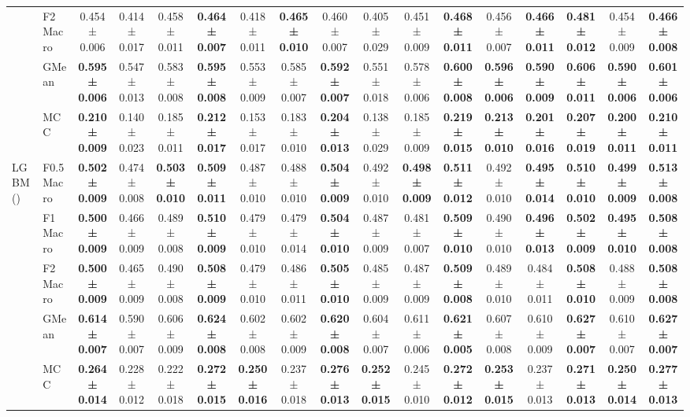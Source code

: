 \begin{table}[H]
{\begin{tabular}{llccccccccccccccc}
 & F2 Macro & 0.454 ± 0.006 & 0.414 ± 0.017 & 0.458 ± 0.011 & \textbf{0.464 ± 0.007} & 0.418 ± 0.011 & \textbf{0.465 ± 0.010} & 0.460 ± 0.007 & 0.405 ± 0.029 & 0.451 ± 0.009 & \textbf{0.468 ± 0.011} & 0.456 ± 0.007 & \textbf{0.466 ± 0.011} & \textbf{0.481 ± 0.012} & 0.454 ± 0.009 & \textbf{0.466 ± 0.008} \\
 & GMean & \textbf{0.595 ± 0.006} & 0.547 ± 0.013 & 0.583 ± 0.008 & \textbf{0.595 ± 0.008} & 0.553 ± 0.009 & 0.585 ± 0.007 & \textbf{0.592 ± 0.007} & 0.551 ± 0.018 & 0.578 ± 0.006 & \textbf{0.600 ± 0.008} & \textbf{0.596 ± 0.006} & \textbf{0.590 ± 0.009} & \textbf{0.606 ± 0.011} & \textbf{0.590 ± 0.006} & \textbf{0.601 ± 0.006} \\
 & MCC & \textbf{0.210 ± 0.009} & 0.140 ± 0.023 & 0.185 ± 0.011 & \textbf{0.212 ± 0.017} & 0.153 ± 0.017 & 0.183 ± 0.010 & \textbf{0.204 ± 0.013} & 0.138 ± 0.029 & 0.185 ± 0.009 & \textbf{0.219 ± 0.015} & \textbf{0.213 ± 0.010} & \textbf{0.201 ± 0.016} & \textbf{0.207 ± 0.019} & \textbf{0.200 ± 0.011} & \textbf{0.210 ± 0.011} \\
\cline{1-17}
\multirow[t]{5}{*}{LGBM()} & F0.5 Macro & \textbf{0.502 ± 0.009} & 0.474 ± 0.008 & \textbf{0.503 ± 0.010} & \textbf{0.509 ± 0.011} & 0.487 ± 0.010 & 0.488 ± 0.010 & \textbf{0.504 ± 0.009} & 0.492 ± 0.010 & \textbf{0.498 ± 0.009} & \textbf{0.511 ± 0.012} & 0.492 ± 0.010 & \textbf{0.495 ± 0.014} & \textbf{0.510 ± 0.010} & \textbf{0.499 ± 0.009} & \textbf{0.513 ± 0.008} \\
 & F1 Macro & \textbf{0.500 ± 0.009} & 0.466 ± 0.009 & 0.489 ± 0.008 & \textbf{0.510 ± 0.009} & 0.479 ± 0.010 & 0.479 ± 0.014 & \textbf{0.504 ± 0.010} & 0.487 ± 0.009 & 0.481 ± 0.007 & \textbf{0.509 ± 0.010} & 0.490 ± 0.010 & \textbf{0.496 ± 0.013} & \textbf{0.502 ± 0.009} & \textbf{0.495 ± 0.010} & \textbf{0.508 ± 0.008} \\
 & F2 Macro & \textbf{0.500 ± 0.009} & 0.465 ± 0.009 & 0.490 ± 0.008 & \textbf{0.508 ± 0.009} & 0.479 ± 0.010 & 0.486 ± 0.011 & \textbf{0.505 ± 0.010} & 0.485 ± 0.009 & 0.487 ± 0.009 & \textbf{0.509 ± 0.008} & 0.489 ± 0.010 & 0.484 ± 0.011 & \textbf{0.508 ± 0.010} & 0.488 ± 0.009 & \textbf{0.508 ± 0.008} \\
 & GMean & \textbf{0.614 ± 0.007} & 0.590 ± 0.007 & 0.606 ± 0.009 & \textbf{0.624 ± 0.008} & 0.602 ± 0.008 & 0.602 ± 0.009 & \textbf{0.620 ± 0.008} & 0.604 ± 0.007 & 0.611 ± 0.006 & \textbf{0.621 ± 0.005} & 0.607 ± 0.008 & 0.610 ± 0.009 & \textbf{0.627 ± 0.007} & 0.610 ± 0.007 & \textbf{0.627 ± 0.007} \\
 & MCC & \textbf{0.264 ± 0.014} & 0.228 ± 0.012 & 0.222 ± 0.018 & \textbf{0.272 ± 0.015} & \textbf{0.250 ± 0.016} & 0.237 ± 0.018 & \textbf{0.276 ± 0.013} & \textbf{0.252 ± 0.015} & 0.245 ± 0.010 & \textbf{0.272 ± 0.012} & \textbf{0.253 ± 0.015} & 0.237 ± 0.013 & \textbf{0.271 ± 0.013} & \textbf{0.250 ± 0.014} & \textbf{0.277 ± 0.013} \\

\end{tabular}}
\end{table}

